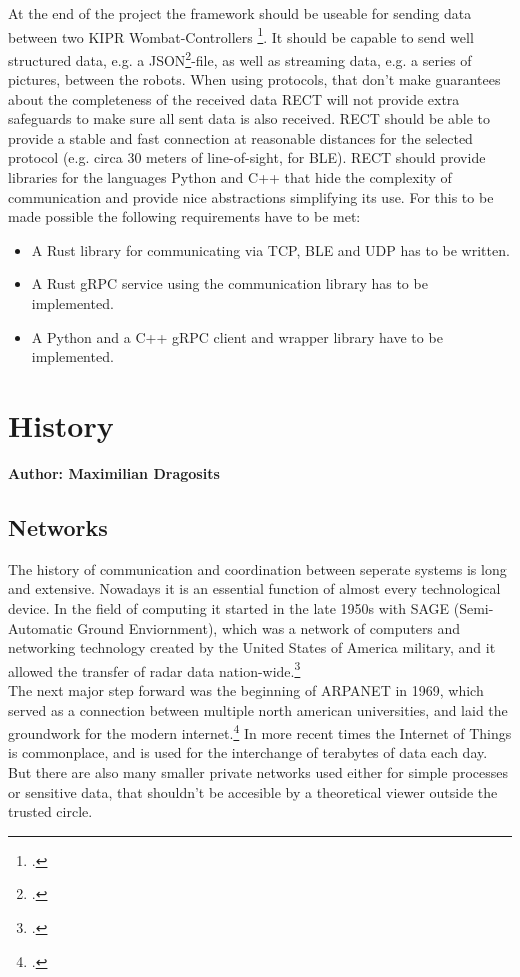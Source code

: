 At the end of the project the framework should be useable for sending data between two KIPR Wombat-Controllers \footcite{wombat-controller}. It should be capable
to send well structured data, e.g. a JSON\footcite{json}-file, as well as streaming data, e.g. a series of pictures, between the robots. When using protocols, that don't make guarantees about
the completeness of the received data RECT will not provide extra safeguards to make sure all sent data is also received.
RECT should be able to provide a stable and fast connection at reasonable distances for the selected protocol (e.g. circa 30 meters of line-of-sight, for BLE).
RECT should provide libraries for the languages Python and C++ that hide the complexity of communication and provide nice abstractions simplifying its use.
For this to be made possible the following requirements have to be met:
\begin{itemize}
\item A Rust library for communicating via TCP, BLE and UDP has to be written.
\item A Rust gRPC service using the communication library has to be implemented.
\item A Python and a C++ gRPC client and wrapper library have to be implemented.
\end{itemize}

\section{History}
\textbf{Author: Maximilian Dragosits}
\subsection{Networks}
The history of communication and coordination between seperate systems is long and extensive. Nowadays it is an essential 
function of almost every technological device. In the field of computing it started in the late 1950s with SAGE (Semi-Automatic Ground Enviornment),
which was a network of computers and networking technology created by the United States of America military, 
and it allowed the transfer of radar data nation-wide.\footcite[][89]{A_New_History_of_Modern_Computing}\\
The next major step forward was the beginning of ARPANET in 1969, which served as a connection between multiple north american 
universities, and laid the groundwork for the modern internet.\footcite[][25]{How_the_web_was_born}
In more recent times the Internet of Things is commonplace, and is used for the interchange of terabytes of data each day. 
But there are also many smaller private networks used either for simple processes or sensitive data, that shouldn't be 
accesible by a theoretical viewer outside the trusted circle. 

